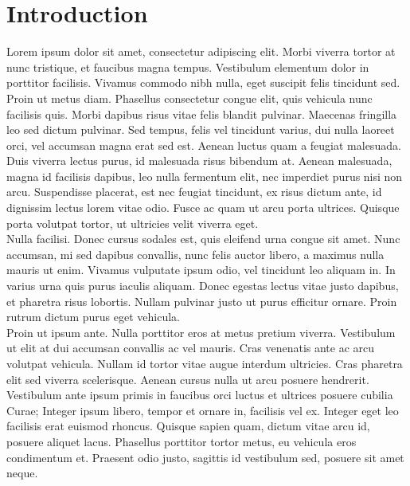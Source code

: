 \documentclass[10pt, onecolumn, twoside, peerreview]{IEEEtran}
\begin{document}
\section{Introduction} 
 Lorem ipsum dolor sit amet, consectetur adipiscing elit. Morbi viverra tortor at nunc tristique,
et faucibus magna tempus. Vestibulum elementum dolor in porttitor facilisis. Vivamus commodo nibh nulla, eget suscipit
felis tincidunt sed. Proin ut metus diam. Phasellus consectetur congue elit, quis vehicula nunc facilisis quis. Morbi
dapibus risus vitae felis blandit pulvinar. Maecenas fringilla leo sed dictum pulvinar. Sed tempus, felis vel tincidunt
varius, dui nulla laoreet orci, vel accumsan magna erat sed est. Aenean luctus quam a feugiat malesuada. Duis viverra
lectus purus, id malesuada risus bibendum at. Aenean malesuada, magna id facilisis dapibus, leo nulla fermentum elit,
nec imperdiet purus nisi non arcu. Suspendisse placerat, est nec feugiat tincidunt, ex risus dictum ante, id dignissim
lectus lorem vitae odio. Fusce ac quam ut arcu porta ultrices. Quisque porta volutpat tortor, ut ultricies velit
viverra eget.\\

Nulla facilisi. Donec cursus sodales est, quis eleifend urna congue sit amet. Nunc accumsan, mi sed dapibus convallis,
nunc felis auctor libero, a maximus nulla mauris ut enim. Vivamus vulputate ipsum odio, vel tincidunt leo aliquam in.
In varius urna quis purus iaculis aliquam. Donec egestas lectus vitae justo dapibus, et pharetra risus lobortis. Nullam
pulvinar justo ut purus efficitur ornare. Proin rutrum dictum purus eget vehicula.\\

Proin ut ipsum ante. Nulla porttitor eros at metus pretium viverra. Vestibulum ut elit at dui accumsan convallis ac vel
mauris. Cras venenatis ante ac arcu volutpat vehicula. Nullam id tortor vitae augue interdum ultricies. Cras pharetra
elit sed viverra scelerisque. Aenean cursus nulla ut arcu posuere hendrerit. Vestibulum ante ipsum primis in faucibus
orci luctus et ultrices posuere cubilia Curae; Integer ipsum libero, tempor et ornare in, facilisis vel ex. Integer
eget leo facilisis erat euismod rhoncus. Quisque sapien quam, dictum vitae arcu id, posuere aliquet lacus. Phasellus
porttitor tortor metus, eu vehicula eros condimentum et. Praesent odio justo, sagittis id vestibulum sed, posuere sit
amet neque.\\
\end{document}
